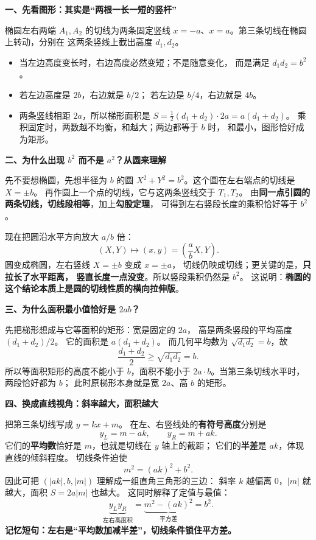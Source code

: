 \begin{explanationbox}
\textbf{一、先看图形：其实是“两根一长一短的竖杆”}

椭圆左右两端 $A_1,A_2$ 的切线为两条固定竖线
$x=-a$、$x=a$。第三条切线在椭圆上转动，分别在
这两条竖线上截出高度 $d_1,d_2$。
\begin{itemize}
  \item 当左边高度变长时，右边高度必然变短；不是随意变化，
  而是满足 $d_1d_2=b^2$。
  \item 若左边高度是 $2b$，右边就是 $b/2$；
  若左边是 $b/4$，右边就是 $4b$。
  \item 两条竖线相距 $2a$，所以梯形面积是
  $S=\frac12(d_1+d_2)\cdot2a=a(d_1+d_2)$。
  乘积固定时，两数越不均衡，和越大；两边都等于 $b$ 时，
  和最小，图形恰好成为矩形。
\end{itemize}

\textbf{二、为什么出现 $b^2$ 而不是 $a^2$？从圆来理解}

先不要想椭圆，先想半径为 $b$ 的圆
$X^2+Y^2=b^2$。这个圆在左右端点的切线是 $X=\pm b$。
再作圆上一个点的切线，它与这两条竖线交于 $T_1,T_2$。
由\textbf{同一点引圆的两条切线，切线段相等}，加上\textbf{勾股定理}，
可得到左右竖段长度的乘积恰好等于 $b^2$。

现在把圆沿水平方向放大 $a/b$ 倍：
\[
(X,Y)\longmapsto(x,y)=\left(\frac abX,Y\right).
\]
圆变成椭圆，左右竖线 $X=\pm b$ 变成 $x=\pm a$，
切线仍映成切线；更关键的是，\textbf{只拉长了水平距离，
竖直长度一点没变}。所以竖段乘积仍然是 $b^2$。
这说明：\textbf{椭圆的这个结论本质上是圆的切线性质的横向拉伸版}。

\textbf{三、为什么面积最小值恰好是 $2ab$？}

先把梯形想成与它等面积的矩形：宽是固定的 $2a$，
高是两条竖段的平均高度 $(d_1+d_2)/2$。
它的面积是 $a(d_1+d_2)$。
而几何平均数为 $\sqrt{d_1d_2}=b$，故
\[
\frac{d_1+d_2}{2}\ge\sqrt{d_1d_2}=b.
\]
所以等面积矩形的高度不能小于 $b$，面积不能小于
$2a\cdot b$。当第三条切线水平时，两段恰好都为 $b$；
此时原梯形本身就是宽 $2a$、高 $b$ 的矩形。

\textbf{四、换成直线视角：斜率越大，面积越大}

把第三条切线写成 $y=kx+m$。
在左、右竖线处的\textbf{有符号高度}分别是
\[
y_L=m-ak,\qquad y_R=m+ak.
\]
它们的\textbf{平均数}恰好是 $m$，也就是切线在 $y$ 轴上的截距；
它们的\textbf{半差}是 $ak$，体现直线的倾斜程度。
切线条件迫使
\[
m^2=(ak)^2+b^2.
\]
因此可把 $(|ak|,b,|m|)$ 理解成一组直角三角形的三边：
斜率 $k$ 越偏离 $0$，$|m|$ 就越大，面积 $S=2a|m|$ 也越大。
这同时解释了定值与最值：
\[
\underbrace{y_Ly_R}_{\text{左右高度积}}
=\underbrace{m^2-(ak)^2}_{\text{平方差}}=b^2.
\]
\textbf{记忆短句：左右是“平均数加减半差”，切线条件锁住平方差。}


\end{explanationbox}
